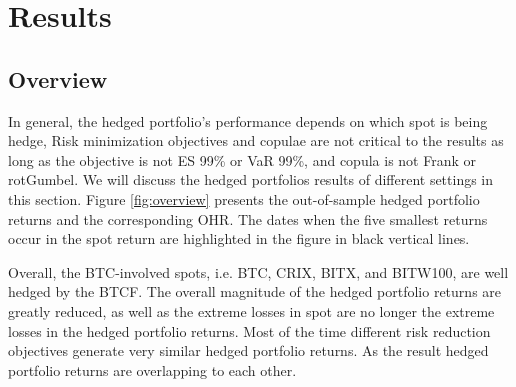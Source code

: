 \section{Results}\label{sec:results}

%

\subsection{Overview}\label{sec:overview}


In general, the hedged portfolio's performance depends on which spot is being hedge,
Risk minimization objectives and copulae are not critical to the
results as long as the objective is not ES 99\% or VaR 99\%, and
copula is not Frank or rotGumbel. 
We will discuss the hedged portfolios results of different settings in this section.
Figure \ref{fig:overview} presents the out-of-sample hedged portfolio
returns and the corresponding OHR. 
The dates when the five smallest returns occur in the spot return are
highlighted in the figure in black vertical lines.
\natp{\em [The figure is extremely small. How about separating the
  cryptos and the indices? Make sure the axes are the same in all
  types of plots. Explain the choice of $k=10$ for the ERM.]}

Overall, the BTC-involved spots, i.e. BTC, CRIX, BITX, and BITW100,
are well hedged \natp{\em [?]} by the BTCF.
The overall magnitude of the hedged portfolio returns are greatly
reduced, as well as the extreme losses in spot are no longer the
extreme losses in the hedged portfolio returns. 
Most of the time different risk reduction objectives generate very similar hedged portfolio returns.
As the result hedged portfolio returns are overlapping to each other.


